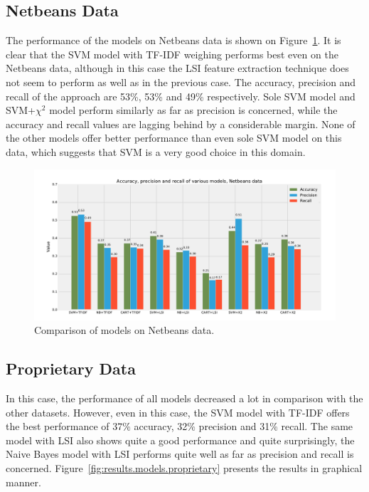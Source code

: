 \subsection{Netbeans Data}

The performance of the models on Netbeans data is shown on Figure~\ref{fig:results.models.netbeans}. It is clear that the SVM model with TF-IDF weighing performs best even on the Netbeans data, although in this case the LSI feature extraction technique does not seem to perform as well as in the previous case. The accuracy, precision and recall of the approach are 53\%, 53\% and 49\% respectively. Sole SVM model and SVM+$\chi^2$ model perform similarly as far as precision is concerned, while the accuracy and recall values are lagging behind by a considerable margin. None of the other models offer better performance than even sole SVM model on this data, which suggests that SVM is a very good choice in this domain.

\begin{figure}[htbp]
    \centering
        \includegraphics[width=\textwidth]{./images/comparison_of_models/netbeans.pdf}
    \caption{Comparison of models on Netbeans data.}
    \label{fig:results.models.netbeans}
\end{figure}

\subsection{Proprietary Data}

In this case, the performance of all models decreased a lot in comparison with the other datasets. However, even in this case, the SVM model with TF-IDF offers the best performance of 37\% accuracy, 32\% precision and 31\% recall. The same model with LSI also shows quite a good performance and quite surprisingly, the Naive Bayes model with LSI performs quite well as far as precision and recall is concerned. Figure~\ref{fig:results.models.proprietary} presents the results in graphical manner.

